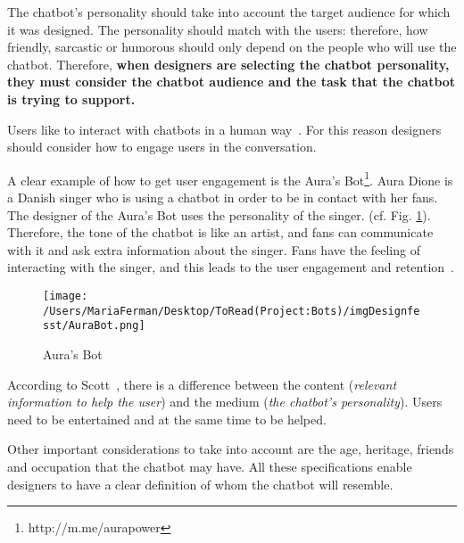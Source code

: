 \documentclass[a4paper,10pt]{article}
\begin{document}
The chatbot’s personality should take into account the target audience for which it was designed. The personality should match with the users: therefore, how friendly, sarcastic or humorous should only depend on the people who will use the chatbot. Therefore, \textbf{when designers are selecting the chatbot personality, they must consider the chatbot audience and the task that the chatbot is trying to support.}  

Users like to interact with chatbots in a human way~\cite{HeuristicsWebPage}. For this reason designers should consider how to engage users in the conversation. 

A clear example of how to get user engagement is the Aura's Bot\footnote{http://m.me/aurapower}. Aura Dione is a Danish singer who is using a chatbot in order to be in contact with her fans. The designer of the Aura's Bot uses the personality of the singer. (cf. Fig. \ref{FigureAura}). Therefore, the tone of the chatbot is like an artist, and fans can communicate with it and ask extra information about the singer. Fans have the feeling of interacting with the singer, and this leads to the user engagement and retention~\cite{personality}.  

\begin{figure}
\centering
\texttt{[image: /Users/MariaFerman/Desktop/ToRead(Project:Bots)/imgDesignfesst/AuraBot.png]}
\caption{Aura's Bot}
\label{FigureAura}
\end{figure}

According to Scott~\cite{HeuristicsWebPage}, there is a difference between the content (\textit{relevant information to help the user}) and the medium (\textit{the chatbot’s personality}). Users need to be entertained and at the same time to be helped.      


Other important considerations to take into account are the age, heritage, friends and occupation that the chatbot may have. All these specifications enable designers to have a clear definition of whom the chatbot will resemble.
\end{document}
